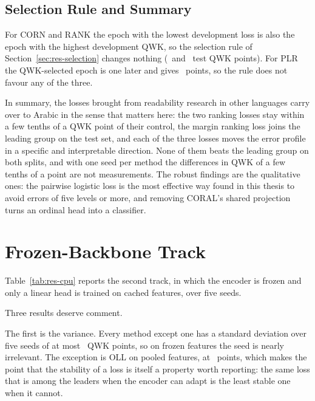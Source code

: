 \subsection{Selection Rule and Summary}

For CORN and RANK the epoch with the lowest development loss is also the epoch with the highest
development QWK, so the selection rule of Section~\ref{sec:res-selection} changes nothing
(\nlQwkselTestGainCorn\ and \nlQwkselTestGainRank\ test QWK points). For PLR the QWK-selected
epoch is one later and gives \nlQwkselTestGainPlr\ points, so the rule does not favour any of the
three.

In summary, the losses brought from readability research in other languages carry over to
Arabic in the sense that matters here: the two ranking losses stay within a few tenths of a QWK
point of their control, the margin ranking loss joins the leading group on the test set, and each
of the three losses moves the error profile in a specific and interpretable direction. None of them beats the leading group on both splits, and with one seed per method the
differences in QWK of a few tenths of a point are not measurements. The robust findings are the
qualitative ones: the pairwise logistic loss is the most effective way found in this thesis to
avoid errors of five levels or more, and removing CORAL's shared projection turns an ordinal head
into a classifier.

\section{Frozen-Backbone Track}
\label{sec:res-frozen}

Table~\ref{tab:res-cpu} reports the second track, in which the encoder is frozen and only a
linear head is trained on cached features, over five seeds.



Three results deserve comment.

The first is the variance. Every method except one has a standard deviation over five seeds of
at most \cpuStdMaxQwk\ QWK points, so on frozen features the seed is nearly irrelevant. The
exception is OLL on pooled features, at \cpuStdOll\ points, which makes the point that the
stability of a loss is itself a property worth reporting: the same loss that is among the
leaders when the encoder can adapt is the least stable one when it cannot.

